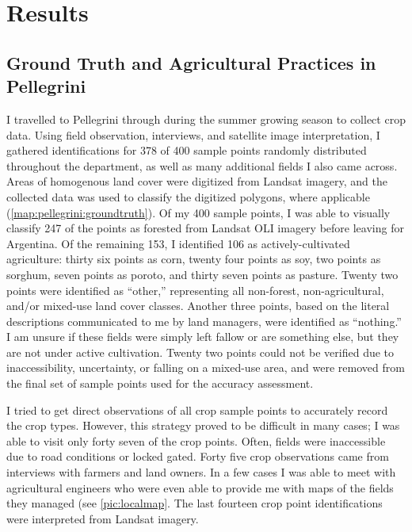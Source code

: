\chapter{Results}
\label{chapter:results}

\section{Ground Truth and Agricultural Practices in Pellegrini}

I travelled to Pellegrini  through  during the summer growing season to collect crop data. Using field observation, interviews, and satellite image interpretation, I gathered identifications for 378 of 400 sample points randomly distributed throughout the department, as well as many additional fields I also came across. Areas of homogenous land cover were digitized from Landsat imagery, and the collected data was used to classify the digitized polygons, where applicable (\autoref{map:pellegrini:groundtruth}). Of my 400 sample points, I was able to visually classify 247 of the points as forested from Landsat OLI imagery before leaving for Argentina. Of the remaining 153, I identified 106 as actively-cultivated agriculture: thirty six points as corn, twenty four points as soy, two points as sorghum, seven points as poroto, and thirty seven points as pasture. Twenty two points were identified as ``other,'' representing all non-forest, non-agricultural, and/or mixed-use land cover classes. Another three points, based on the literal descriptions communicated to me by land managers, were identified as ``nothing.'' I am unsure if these fields were simply left fallow or are something else, but they are not under active cultivation. Twenty two points could not be verified due to inaccessibility, uncertainty, or falling on a mixed-use area, and were removed from the final set of sample points used for the accuracy assessment.

I tried to get direct observations of all crop sample points to accurately record the crop types. However, this strategy proved to be difficult in many cases; I was able to visit only forty seven of the crop points. Often, fields were inaccessible due to road conditions or locked gated. Forty five crop observations came from interviews with farmers and land owners. In a few cases I was able to meet with agricultural engineers who were even able to provide me with maps of the fields they managed (see \autoref{pic:localmap}. The last fourteen crop point identifications were interpreted from Landsat imagery.

